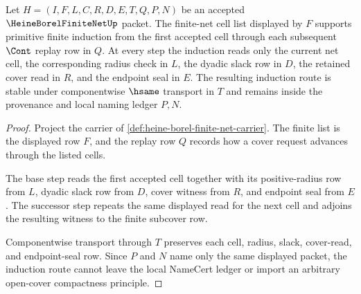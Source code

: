 \begin{theorem}
\label{thm:heine-borel-finite-net-primitive-induction-route}
Let $H=(I,F,L,C,R,D,E,T,Q,P,N)$ be an accepted $\HeineBorelFiniteNetUp$ packet. The finite-net cell list displayed by $F$ supports primitive finite induction from the first accepted cell through each subsequent $\Cont$ replay row in $Q$. At every step the induction reads only the current net cell, the corresponding radius check in $L$, the dyadic slack row in $D$, the retained cover read in $R$, and the endpoint seal in $E$. The resulting induction route is stable under componentwise $\hsame$ transport in $T$ and remains inside the provenance and local naming ledger $P,N$.
\end{theorem}
\begin{proof}
Project the carrier of \autoref{def:heine-borel-finite-net-carrier}. The finite list is the displayed row $F$, and the replay row $Q$ records how a cover request advances through the listed cells.

The base step reads the first accepted cell together with its positive-radius row from $L$, dyadic slack row from $D$, cover witness from $R$, and endpoint seal from $E$. The successor step repeats the same displayed read for the next cell and adjoins the resulting witness to the finite subcover row.

Componentwise transport through $T$ preserves each cell, radius, slack, cover-read, and endpoint-seal row. Since $P$ and $N$ name only the same displayed packet, the induction route cannot leave the local NameCert ledger or import an arbitrary open-cover compactness principle.
\end{proof}

